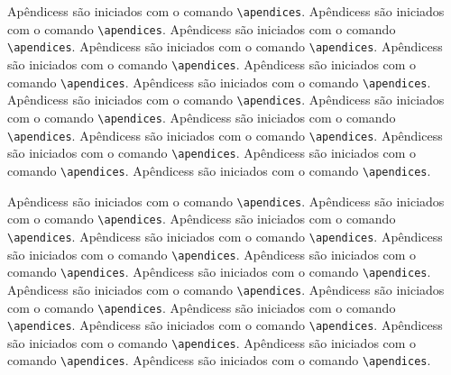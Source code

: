 Apêndicess são iniciados com o comando \verb|\apendices|.
Apêndicess são iniciados com o comando \verb|\apendices|.
Apêndicess são iniciados com o comando \verb|\apendices|.
Apêndicess são iniciados com o comando \verb|\apendices|.
Apêndicess são iniciados com o comando \verb|\apendices|.
Apêndicess são iniciados com o comando \verb|\apendices|.
Apêndicess são iniciados com o comando \verb|\apendices|.
Apêndicess são iniciados com o comando \verb|\apendices|.
Apêndicess são iniciados com o comando \verb|\apendices|.
Apêndicess são iniciados com o comando \verb|\apendices|.
Apêndicess são iniciados com o comando \verb|\apendices|.
Apêndicess são iniciados com o comando \verb|\apendices|.
Apêndicess são iniciados com o comando \verb|\apendices|.
Apêndicess são iniciados com o comando \verb|\apendices|.

Apêndicess são iniciados com o comando \verb|\apendices|.
Apêndicess são iniciados com o comando \verb|\apendices|.
Apêndicess são iniciados com o comando \verb|\apendices|.
Apêndicess são iniciados com o comando \verb|\apendices|.
Apêndicess são iniciados com o comando \verb|\apendices|.
Apêndicess são iniciados com o comando \verb|\apendices|.
Apêndicess são iniciados com o comando \verb|\apendices|.
Apêndicess são iniciados com o comando \verb|\apendices|.
Apêndicess são iniciados com o comando \verb|\apendices|.
Apêndicess são iniciados com o comando \verb|\apendices|.
Apêndicess são iniciados com o comando \verb|\apendices|.
Apêndicess são iniciados com o comando \verb|\apendices|.
Apêndicess são iniciados com o comando \verb|\apendices|.
Apêndicess são iniciados com o comando \verb|\apendices|.